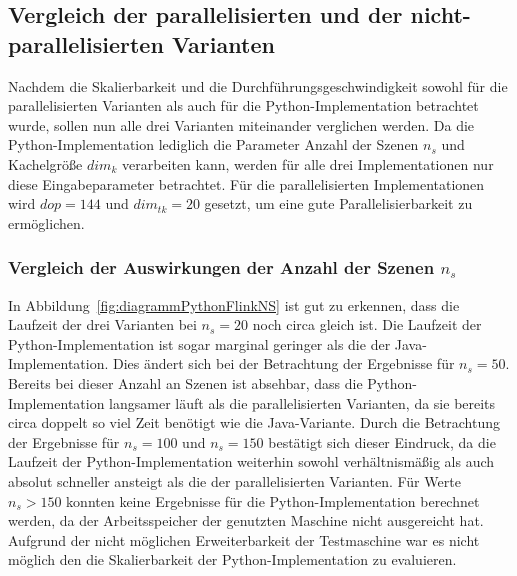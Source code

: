 \subsection{Vergleich der parallelisierten und der nicht-parallelisierten Varianten}
Nachdem die Skalierbarkeit und die Durchführungsgeschwindigkeit sowohl für die parallelisierten Varianten als auch für die Python-Implementation betrachtet wurde, sollen nun alle drei Varianten miteinander verglichen werden. Da die Python-Implementation lediglich die Parameter Anzahl der Szenen $n_s$ und Kachelgröße $dim_k$ verarbeiten kann, werden für alle drei Implementationen nur diese Eingabeparameter betrachtet. Für die parallelisierten Implementationen wird $dop=144$ und $dim_{tk} = 20$ gesetzt, um eine gute Parallelisierbarkeit zu ermöglichen.

\subsubsection{Vergleich der Auswirkungen der Anzahl der Szenen $n_s$}
In Abbildung~\ref{fig:diagrammPythonFlinkNS} ist gut zu erkennen, dass die Laufzeit der drei Varianten bei $n_s = 20$ noch circa gleich ist. Die Laufzeit der Python-Implementation ist sogar marginal geringer als die der Java-Implementation. Dies ändert sich bei der Betrachtung der Ergebnisse für $n_s = 50$. Bereits bei dieser Anzahl an Szenen ist absehbar, dass die Python-Implementation langsamer läuft als die parallelisierten Varianten, da sie bereits circa doppelt so viel Zeit benötigt wie die Java-Variante. Durch die Betrachtung der Ergebnisse für $n_s=100$ und $n_s=150$ bestätigt sich dieser Eindruck, da die Laufzeit der Python-Implementation weiterhin sowohl verhältnismäßig als auch absolut schneller ansteigt als die der parallelisierten Varianten. Für Werte $n_s > 150$ konnten keine Ergebnisse für die Python-Implementation berechnet werden, da der Arbeitsspeicher der genutzten Maschine nicht ausgereicht hat. Aufgrund der nicht möglichen Erweiterbarkeit der Testmaschine war es nicht möglich den die Skalierbarkeit der Python-Implementation zu evaluieren.

